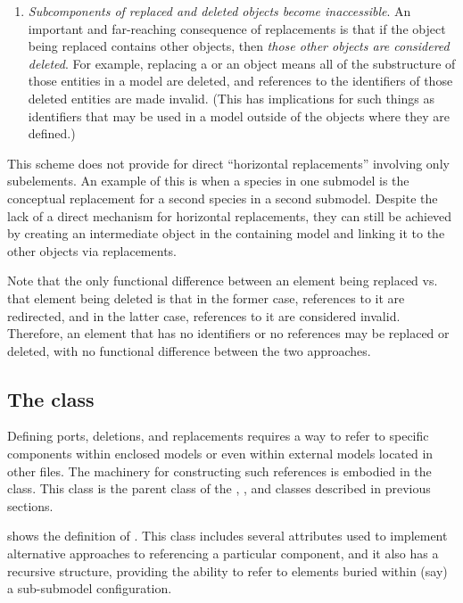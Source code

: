 \begin{enumerate}
\item \emph{Subcomponents of replaced and deleted objects become
    inaccessible}.  An important and far-reaching consequence of
  replacements is that if the object being replaced contains other
  objects, then \emph{those other objects are considered deleted}.  For
  example, replacing a \Reaction or an \Event object means all of the
  substructure of those entities in a model are deleted, and references
  to the identifiers of those deleted entities are made invalid.  (This
  has implications for such things as \SpeciesReference identifiers that
  may be used in a model outside of the \Reaction objects where they are
  defined.)

\end{enumerate}

This scheme does not provide for direct ``horizontal replacements'' involving
only subelements.  An example of this is when a species in one submodel is
the conceptual replacement for a second species in a second submodel.
Despite the lack of a direct mechanism for horizontal replacements, they can
still be achieved by creating an intermediate object in the containing model
and linking it to the other objects via replacements.

Note that the only functional difference between an element being replaced
vs. that element being deleted is that in the former case, references
to it are redirected, and in the latter case, references to it are 
considered invalid.  Therefore, an element that has no identifiers or
no references may be replaced or deleted, with no functional difference
between the two approaches.

\subsection{The  class}
\label{sbaseref-class}

Defining ports, deletions, and replacements requires a way to refer to
specific components within enclosed models or even within external models
located in other files.  The machinery for constructing such references
is embodied in the \SBaseRef class.  This class is the parent class of
the \Port, \Deletion, \ReplacedElement and \ReplacedBy classes described
in previous sections.

 shows the definition of \SBaseRef.  This class
includes several attributes used to implement alternative approaches to
referencing a particular component, and it also has a recursive
structure, providing the ability to refer to elements buried within
(say) a sub-submodel configuration.

